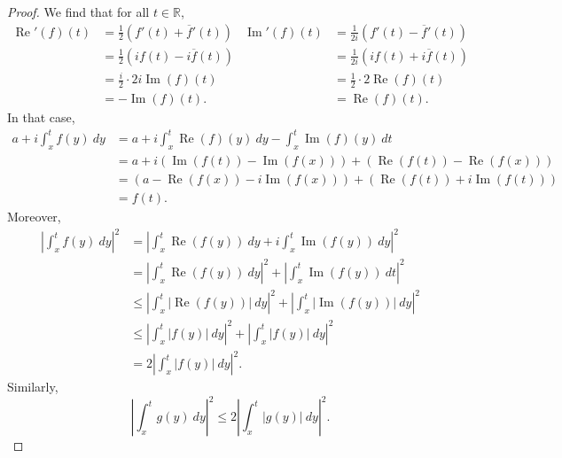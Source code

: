 \documentclass[a4paper, openany]{memoir}
\theoremstyle{definition}
\theoremstyle{plain}
\begin{document}
\begin{proof}
We find that for all $t \in \mathbb{R}$,
\begin{align*}
    \operatorname{Re}'(f)(t) &= \frac{1}{2}(f'(t) + \overline{f}'(t)) & \operatorname{Im}'(f)(t) &= \frac{1}{2i}(f'(t) - \overline{f}'(t))\\
    &= \frac{1}{2}(if(t) - i\overline{f}(t)) & &= \frac{1}{2i}(if(t) + i\overline{f}(t)) \\
    &= \frac{i}{2} \cdot 2i \operatorname{Im}(f)(t) & &= \frac{1}{2} \cdot 2 \operatorname{Re}(f)(t) \\
    &= -\operatorname{Im}(f)(t). & &= \operatorname{Re}(f)(t).
\end{align*}
In that case,
\begin{align*}
    a + i \int_x^t f(y) \ dy &= a + i \int_x^t \operatorname{Re}(f)(y) \ dy - \int_x^t \operatorname{Im}(f)(y) \ dt \\
    &= a + i(\operatorname{Im}(f(t)) - \operatorname{Im}(f(x))) + (\operatorname{Re}(f(t)) - \operatorname{Re}(f(x))) \\
    &= (a - \operatorname{Re}(f(x)) -i \operatorname{Im}(f(x))) + (\operatorname{Re}(f(t)) + i\operatorname{Im}(f(t))) \\
    &= f(t).
\end{align*}
Moreover,
\begin{align*}
    \left|\int_x^t f(y) \ dy\right|^2 &= \left|\int_x^t \operatorname{Re}(f(y)) \ dy + i \int_x^t \operatorname{Im}(f(y)) \ dy\right|^2 \\
    &= \left|\int_x^t \operatorname{Re}(f(y)) \ dy\right|^2 + \left|\int_x^t \operatorname{Im}(f(y)) \ dt\right|^2 \\
    &\leqslant \left|\int_x^t |\operatorname{Re}(f(y))| \ dy\right|^2 + \left|\int_x^t |\operatorname{Im}(f(y))| \ dy\right|^2 \\
    &\leqslant \left|\int_x^t |f(y)| \ dy\right|^2 + \left|\int_x^t |f(y)| \ dy\right|^2 \\
    &= 2\left|\int_x^t |f(y)| \ dy\right|^2.
\end{align*}
Similarly, 
\[\left|\int_x^t g(y) \ dy\right|^2 \leqslant  2\left|\int_x^t |g(y)| \ dy\right|^2.\]


\end{proof}
\end{document}
